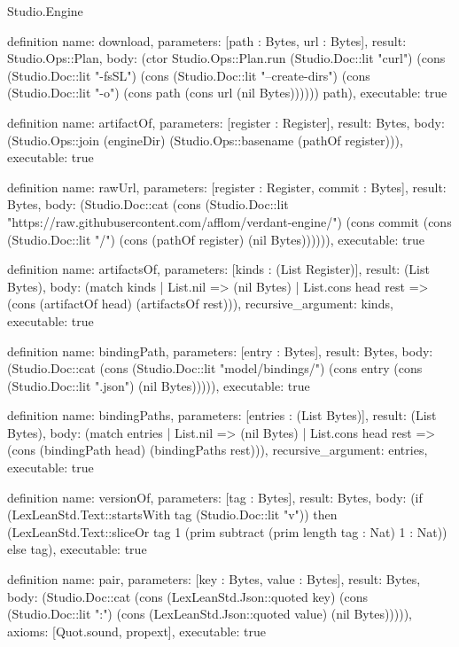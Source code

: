 \begin{lexlean}{Studio.Engine}
\begin{semanticmodule}
definition{
  name: download,
  parameters: [path : Bytes, url : Bytes],
  result: Studio.Ops::Plan,
  body: (ctor Studio.Ops::Plan.run (Studio.Doc::lit "curl") (cons (Studio.Doc::lit "-fsSL") (cons (Studio.Doc::lit "--create-dirs") (cons (Studio.Doc::lit "-o") (cons path (cons url (nil Bytes)))))) path),
  executable: true
}

definition{
  name: artifactOf,
  parameters: [register : Register],
  result: Bytes,
  body: (Studio.Ops::join (engineDir) (Studio.Ops::basename (pathOf register))),
  executable: true
}

definition{
  name: rawUrl,
  parameters: [register : Register, commit : Bytes],
  result: Bytes,
  body: (Studio.Doc::cat (cons (Studio.Doc::lit "https://raw.githubusercontent.com/afflom/verdant-engine/") (cons commit (cons (Studio.Doc::lit "/") (cons (pathOf register) (nil Bytes)))))),
  executable: true
}

definition{
  name: artifactsOf,
  parameters: [kinds : (List Register)],
  result: (List Bytes),
  body: (match kinds
    | List.nil => (nil Bytes)
    | List.cons head rest => (cons (artifactOf head) (artifactsOf rest))),
  recursive_argument: kinds,
  executable: true
}

definition{
  name: bindingPath,
  parameters: [entry : Bytes],
  result: Bytes,
  body: (Studio.Doc::cat (cons (Studio.Doc::lit "model/bindings/") (cons entry (cons (Studio.Doc::lit ".json") (nil Bytes))))),
  executable: true
}

definition{
  name: bindingPaths,
  parameters: [entries : (List Bytes)],
  result: (List Bytes),
  body: (match entries
    | List.nil => (nil Bytes)
    | List.cons head rest => (cons (bindingPath head) (bindingPaths rest))),
  recursive_argument: entries,
  executable: true
}

definition{
  name: versionOf,
  parameters: [tag : Bytes],
  result: Bytes,
  body: (if (LexLeanStd.Text::startsWith tag (Studio.Doc::lit "v")) then (LexLeanStd.Text::sliceOr tag 1 (prim subtract (prim length tag : Nat) 1 : Nat)) else tag),
  executable: true
}

definition{
  name: pair,
  parameters: [key : Bytes, value : Bytes],
  result: Bytes,
  body: (Studio.Doc::cat (cons (LexLeanStd.Json::quoted key) (cons (Studio.Doc::lit ":") (cons (LexLeanStd.Json::quoted value) (nil Bytes))))),
  axioms: [Quot.sound, propext],
  executable: true
}


\end{semanticmodule}
\end{lexlean}
